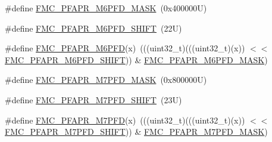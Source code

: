 \begin{DoxyCompactItemize}
\item 
\#define \mbox{\hyperlink{group___f_m_c___register___masks_ga6d5a68ef8363082c0c7077c380e7aad6}{F\+M\+C\+\_\+\+P\+F\+A\+P\+R\+\_\+\+M6\+P\+F\+D\+\_\+\+M\+A\+SK}}~(0x400000\+U)
\item 
\#define \mbox{\hyperlink{group___f_m_c___register___masks_ga5ff1d949214bab253e7b426ca8fb6884}{F\+M\+C\+\_\+\+P\+F\+A\+P\+R\+\_\+\+M6\+P\+F\+D\+\_\+\+S\+H\+I\+FT}}~(22\+U)
\item 
\#define \mbox{\hyperlink{group___f_m_c___register___masks_ga7527356c0e733f4e6fcaee21182a2d0f}{F\+M\+C\+\_\+\+P\+F\+A\+P\+R\+\_\+\+M6\+P\+FD}}(x)~(((uint32\+\_\+t)(((uint32\+\_\+t)(x)) $<$$<$ \mbox{\hyperlink{group___f_m_c___register___masks_ga5ff1d949214bab253e7b426ca8fb6884}{F\+M\+C\+\_\+\+P\+F\+A\+P\+R\+\_\+\+M6\+P\+F\+D\+\_\+\+S\+H\+I\+FT}})) \& \mbox{\hyperlink{group___f_m_c___register___masks_ga6d5a68ef8363082c0c7077c380e7aad6}{F\+M\+C\+\_\+\+P\+F\+A\+P\+R\+\_\+\+M6\+P\+F\+D\+\_\+\+M\+A\+SK}})
\item 
\#define \mbox{\hyperlink{group___f_m_c___register___masks_gac0652379651a8388e65f2e96358b72f1}{F\+M\+C\+\_\+\+P\+F\+A\+P\+R\+\_\+\+M7\+P\+F\+D\+\_\+\+M\+A\+SK}}~(0x800000\+U)
\item 
\#define \mbox{\hyperlink{group___f_m_c___register___masks_ga4589e8d60db033a3ab174e976a5d3dcf}{F\+M\+C\+\_\+\+P\+F\+A\+P\+R\+\_\+\+M7\+P\+F\+D\+\_\+\+S\+H\+I\+FT}}~(23\+U)
\item 
\#define \mbox{\hyperlink{group___f_m_c___register___masks_ga41759a32af7ed16b8a06686eca6de953}{F\+M\+C\+\_\+\+P\+F\+A\+P\+R\+\_\+\+M7\+P\+FD}}(x)~(((uint32\+\_\+t)(((uint32\+\_\+t)(x)) $<$$<$ \mbox{\hyperlink{group___f_m_c___register___masks_ga4589e8d60db033a3ab174e976a5d3dcf}{F\+M\+C\+\_\+\+P\+F\+A\+P\+R\+\_\+\+M7\+P\+F\+D\+\_\+\+S\+H\+I\+FT}})) \& \mbox{\hyperlink{group___f_m_c___register___masks_gac0652379651a8388e65f2e96358b72f1}{F\+M\+C\+\_\+\+P\+F\+A\+P\+R\+\_\+\+M7\+P\+F\+D\+\_\+\+M\+A\+SK}})
\end{DoxyCompactItemize}
